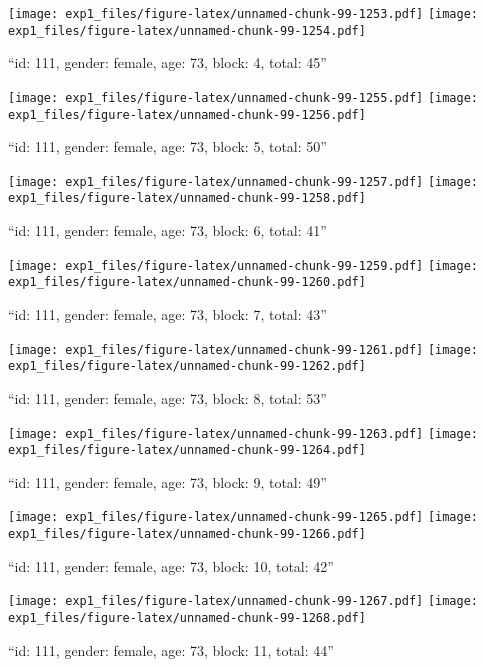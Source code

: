 \documentclass[,]{article}
\begin{document}
\texttt{[image: exp1\_files/figure-latex/unnamed-chunk-99-1253.pdf]}
\texttt{[image: exp1\_files/figure-latex/unnamed-chunk-99-1254.pdf]}

\newpage
[1] 

``id: 111, gender: female, age: 73, block: 4, total: 45''

\texttt{[image: exp1\_files/figure-latex/unnamed-chunk-99-1255.pdf]}
\texttt{[image: exp1\_files/figure-latex/unnamed-chunk-99-1256.pdf]}

\newpage
[1] 

``id: 111, gender: female, age: 73, block: 5, total: 50''

\texttt{[image: exp1\_files/figure-latex/unnamed-chunk-99-1257.pdf]}
\texttt{[image: exp1\_files/figure-latex/unnamed-chunk-99-1258.pdf]}

\newpage
[1] 

``id: 111, gender: female, age: 73, block: 6, total: 41''

\texttt{[image: exp1\_files/figure-latex/unnamed-chunk-99-1259.pdf]}
\texttt{[image: exp1\_files/figure-latex/unnamed-chunk-99-1260.pdf]}

\newpage
[1] 

``id: 111, gender: female, age: 73, block: 7, total: 43''

\texttt{[image: exp1\_files/figure-latex/unnamed-chunk-99-1261.pdf]}
\texttt{[image: exp1\_files/figure-latex/unnamed-chunk-99-1262.pdf]}

\newpage
[1] 

``id: 111, gender: female, age: 73, block: 8, total: 53''

\texttt{[image: exp1\_files/figure-latex/unnamed-chunk-99-1263.pdf]}
\texttt{[image: exp1\_files/figure-latex/unnamed-chunk-99-1264.pdf]}

\newpage
[1] 

``id: 111, gender: female, age: 73, block: 9, total: 49''

\texttt{[image: exp1\_files/figure-latex/unnamed-chunk-99-1265.pdf]}
\texttt{[image: exp1\_files/figure-latex/unnamed-chunk-99-1266.pdf]}

\newpage
[1] 

``id: 111, gender: female, age: 73, block: 10, total: 42''

\texttt{[image: exp1\_files/figure-latex/unnamed-chunk-99-1267.pdf]}
\texttt{[image: exp1\_files/figure-latex/unnamed-chunk-99-1268.pdf]}

\newpage
[1] 

``id: 111, gender: female, age: 73, block: 11, total: 44''
\end{document}
